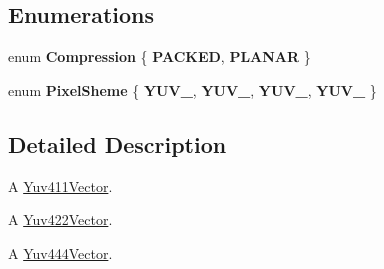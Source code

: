 \subsection*{Enumerations}
\begin{DoxyCompactItemize}
\item 
\hypertarget{namespacePlayer_a56a83bf6847f4801f4205eb4be237ccf}{}enum {\bfseries Compression} \{ {\bfseries P\+A\+C\+K\+E\+D}, 
{\bfseries P\+L\+A\+N\+A\+R}
 \}\label{namespacePlayer_a56a83bf6847f4801f4205eb4be237ccf}

\item 
\hypertarget{namespacePlayer_a52432774abcaf0c8c417ae77739fccfc}{}enum {\bfseries Pixel\+Sheme} \{ {\bfseries Y\+U\+V\+\_}, 
{\bfseries Y\+U\+V\+\_}, 
{\bfseries Y\+U\+V\+\_}, 
{\bfseries Y\+U\+V\+\_}
 \}\label{namespacePlayer_a52432774abcaf0c8c417ae77739fccfc}

\end{DoxyCompactItemize}


\subsection{Detailed Description}
A \hyperlink{classPlayer_1_1Yuv411Vector}{Yuv411\+Vector}.

A \hyperlink{classPlayer_1_1Yuv422Vector}{Yuv422\+Vector}.

A \hyperlink{classPlayer_1_1Yuv444Vector}{Yuv444\+Vector}. 